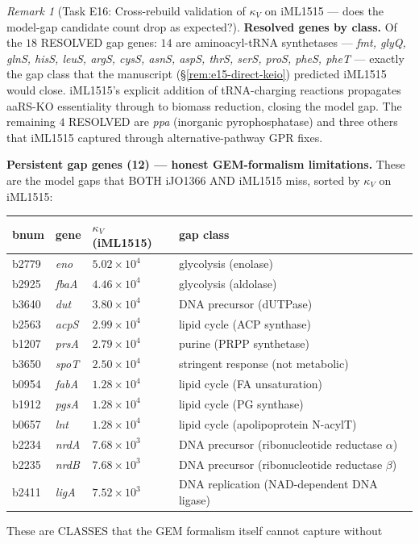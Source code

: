 \documentclass[11pt,a4paper]{article}
\theoremstyle{plain}
\theoremstyle{definition}
\theoremstyle{remark}
\newtheorem{remark}[theorem]{Remark}
\begin{document}
\begin{remark}[Task E16: Cross-rebuild validation of $\kappa_V$ on iML1515
--- does the model-gap candidate count drop as expected?]
\textbf{Resolved genes by class.} Of the $18$ RESOLVED gap genes:
$14$ are aminoacyl-tRNA synthetases --- \emph{fmt, glyQ, glnS, hisS,
leuS, argS, cysS, asnS, aspS, thrS, serS, proS, pheS, pheT} ---
exactly the gap class that the manuscript (\S\ref{rem:e15-direct-keio})
predicted iML1515 would close. iML1515's explicit addition of
tRNA-charging reactions propagates aaRS-KO essentiality through to
biomass reduction, closing the model gap. The remaining $4$ RESOLVED
are \emph{ppa} (inorganic pyrophosphatase) and three others that
iML1515 captured through alternative-pathway GPR fixes.

\textbf{Persistent gap genes (12) --- honest GEM-formalism
limitations.} These are the model gaps that BOTH iJO1366 AND iML1515
miss, sorted by $\kappa_V$ on iML1515:
\begin{center}
\begin{tabular}{llll}
\hline
bnum & gene & $\kappa_V$ (iML1515) & gap class \\
\hline
b2779 & \emph{eno}  & $5.02 \times 10^4$ & glycolysis (enolase) \\
b2925 & \emph{fbaA} & $4.46 \times 10^4$ & glycolysis (aldolase) \\
b3640 & \emph{dut}  & $3.80 \times 10^4$ & DNA precursor (dUTPase) \\
b2563 & \emph{acpS} & $2.99 \times 10^4$ & lipid cycle (ACP synthase) \\
b1207 & \emph{prsA} & $2.79 \times 10^4$ & purine (PRPP synthetase) \\
b3650 & \emph{spoT} & $2.50 \times 10^4$ & stringent response (not metabolic) \\
b0954 & \emph{fabA} & $1.28 \times 10^4$ & lipid cycle (FA unsaturation) \\
b1912 & \emph{pgsA} & $1.28 \times 10^4$ & lipid cycle (PG synthase) \\
b0657 & \emph{lnt}  & $1.28 \times 10^4$ & lipid cycle (apolipoprotein N-acylT) \\
b2234 & \emph{nrdA} & $7.68 \times 10^3$ & DNA precursor (ribonucleotide reductase $\alpha$) \\
b2235 & \emph{nrdB} & $7.68 \times 10^3$ & DNA precursor (ribonucleotide reductase $\beta$) \\
b2411 & \emph{ligA} & $7.52 \times 10^3$ & DNA replication (NAD-dependent DNA ligase) \\
\hline
\end{tabular}
\end{center}
These are CLASSES that the GEM formalism itself cannot capture without

\end{remark}
\end{document}
